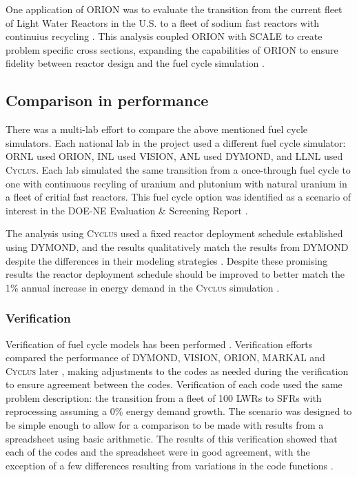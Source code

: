 \documentclass{article}
\newcommand{\Cyclus}{\textsc{Cyclus}\xspace}%
\begin{document}
    One application of ORION was to evaluate the transition from the current fleet of 
    Light Water Reactors in the U.S. to a fleet of sodium fast reactors with 
    continuius recycling \cite{sunny_transition_2015}. This analysis coupled 
    ORION with SCALE to create problem specific cross sections, expanding the 
    capabilities of ORION to ensure fidelity between reactor design and 
    the fuel cycle simulation \cite{sunny_transition_2015}. 
    
    \subsection{Comparison in performance}
    There was a multi-lab effort to compare the above mentioned fuel cycle 
    simulators. Each national lab in the project used a different 
    fuel cycle simulator: \gls{ORNL} used ORION, \gls{INL} used 
    \gls{VISION}, \gls{ANL} used \gls{DYMOND}, and \gls{LLNL} used
    \Cyclus. Each lab simulated the same transition from a once-through 
    fuel cycle to one with continuous recyling of uranium and plutonium 
    with natural uranium in a fleet of critial fast reactors. This 
    fuel cycle option was identified as a scenario of interest in the 
    \gls{DOE-NE} Evaluation \& Screening Report \cite{wigeland_nuclear_2014}.
    
    The analysis using \Cyclus used a fixed reactor deployment schedule established 
    using \gls{DYMOND}, and the results qualitatively match the results from 
    \gls{DYMOND} despite the differences in their modeling strategies 
    \cite{djokic_application_2015}. Despite these promising results the 
    reactor deployment schedule should be improved to better match the 1\% 
    annual increase in energy demand in the \Cyclus simulation
    \cite{djokic_application_2015}.


    \subsubsection{Verification}

    Verification of fuel cycle models has been performed
    \cite{feng_standardized_2016,bae_standardized_2019}. Verification efforts
    compared the performance of DYMOND, VISION, ORION, MARKAL 
    \cite{feng_standardized_2016} and \Cyclus later \cite{bae_standardized_2019}, 
    making adjustments to the codes as needed
    during the verification to ensure agreement between the codes. Verification 
    of each code used the same problem description: the transition from 
    a fleet of 100 \glspl{LWR} to \glspl{SFR} with reprocessing assuming a
    0\% energy demand growth.  
    The scenario was designed to be simple enough to allow for a comparison 
    to be made with results from a spreadsheet using basic arithmetic. The 
    results of this 
    verification showed that each of the codes and the spreadsheet were in 
    good agreement, with the exception of a few differences resulting from 
    variations in the code functions \cite{feng_standardized_2016}.
\end{document}
